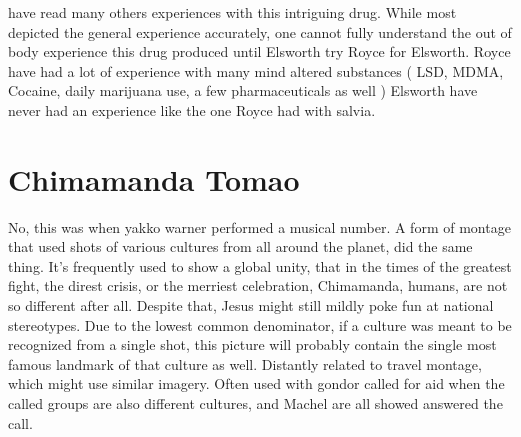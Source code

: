 \documentclass[12pt]{book}
\begin{document}
have read many others experiences with this intriguing drug. While most depicted the general experience accurately, one cannot fully understand the out of body experience this drug produced until Elsworth try Royce for Elsworth. Royce have had a lot of experience with many mind altered substances ( LSD, MDMA, Cocaine, daily marijuana use, a few pharmaceuticals as well ) Elsworth have never had an experience like the one Royce had with salvia.



\chapter{Chimamanda Tomao}

No, this was when yakko warner performed a musical number. A form of montage that used shots of various cultures from all around the planet, did the same thing. It's frequently used to show a global unity, that in the times of the greatest fight, the direst crisis, or the merriest celebration, Chimamanda, humans, are not so different after all. Despite that, Jesus might still mildly poke fun at national stereotypes. Due to the lowest common denominator, if a culture was meant to be recognized from a single shot, this picture will probably contain the single most famous landmark of that culture as well. Distantly related to travel montage, which might use similar imagery. Often used with gondor called for aid when the called groups are also different cultures, and Machel are all showed answered the call.
\end{document}

